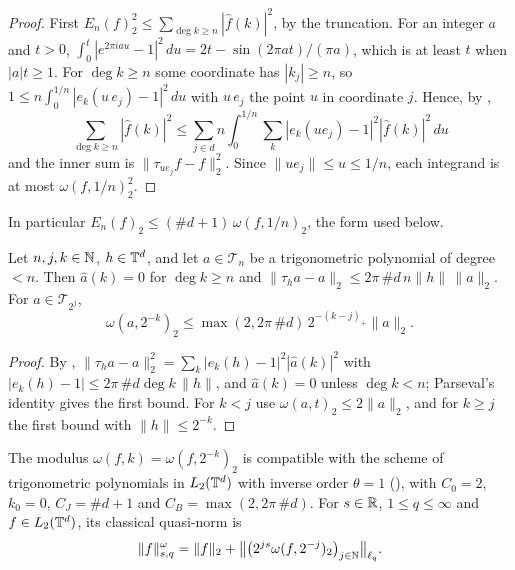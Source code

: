 \begin{proof}
\leanok
First $E_n(f)_2^2 \leq \sum_{\deg k \geq n} |\hat f(k)|^2$, by the truncation. For an integer
$a$ and $t > 0$,
$\int_0^t |e^{2\pi i a u} - 1|^2 \, du = 2t - \sin(2\pi a t)/(\pi a)$, which is at least $t$
when $|a| t \geq 1$. For $\deg k \geq n$ some coordinate has $|k_j| \geq n$, so
$1 \leq n \int_0^{1/n} |e_k(u \, e_j) - 1|^2 \, du$ with $u\,e_j$ the point $u$ in coordinate
$j$. Hence, by ,
\[
  \sum_{\deg k \geq n} |\hat f(k)|^2 \leq \sum_{j \in d} n \int_0^{1/n} \sum_k
  |e_k(u e_j) - 1|^2 |\hat f(k)|^2 \, du
\]
and the inner sum is $\|\tau_{u e_j} f - f\|_2^2$. Since $\|u e_j\| \leq u \leq 1/n$, each
integrand is at most $\omega(f, 1/n)_2^2$.
\end{proof}

In particular $E_n(f)_2 \leq (\#d + 1) \, \omega(f, 1/n)_2$, the form used below.

\begin{lemma}
\label{lem:torus-inverse}
\leanok
{}
Let $n, j, k \in \mathbb{N}$, $h \in \mathbb{T}^d$, and let $a \in \mathcal{T}_n$ be a trigonometric
polynomial of degree $< n$. Then $\hat a(k) = 0$ for $\deg k \geq n$ and
$\|\tau_h a - a\|_2 \leq 2\pi \, \#d \, n \|h\| \, \|a\|_2$. For $a \in \mathcal{T}_{2^j}$,
\[
  \omega(a, 2^{-k})_2 \leq \max(2, 2\pi \, \#d) \, 2^{-(k - j)_+} \|a\|_2 .
\]
\end{lemma}

\begin{proof}
\leanok
By , $\|\tau_h a - a\|_2^2 = \sum_k |e_k(h) - 1|^2 |\hat a(k)|^2$
with $|e_k(h) - 1| \leq 2\pi \, \#d \deg k \, \|h\|$, and $\hat a(k) = 0$ unless
$\deg k < n$; Parseval's identity gives the first bound. For $k < j$ use
$\omega(a, t)_2 \leq 2 \|a\|_2$, and for $k \geq j$ the first bound with $\|h\| \leq 2^{-k}$.
\end{proof}

\begin{definition}
\label{def:modulus-norm}
\leanok
{}
The modulus $\omega(f, k) = \omega(f, 2^{-k})_2$ is compatible with the scheme of trigonometric
polynomials in $L_2(\mathbb{T}^d)$ with inverse order $\theta = 1$ (), with
$C_0 = 2$, $k_0 = 0$, $C_J = \#d + 1$ and $C_B = \max(2, 2\pi \, \#d)$. For $s \in \mathbb{R}$,
$1 \leq q \leq \infty$ and $f \in L_2(\mathbb{T}^d)$, its classical quasi-norm is
\[
  \|f\|^{\omega}_{s,q} = \|f\|_2 + \bigl\| \bigl(2^{js} \omega(f, 2^{-j})_2\bigr)_{j \in \mathbb{N}}
  \bigr\|_{\ell_q} .
\]
\end{definition}


